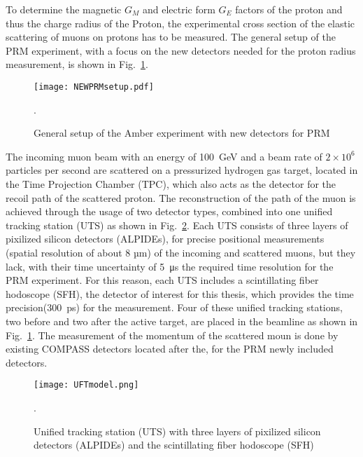 To determine the magnetic $G_M$ and electric form $G_E$ factors of the proton and thus the charge radius of the Proton,
the experimental cross section of the elastic scattering of muons on protons has to be measured.
The general setup of the PRM experiment, with a focus on the new detectors needed for the proton radius measurement, is shown in Fig.~\ref{fig:amber_setup}.
\begin{figure}[H]
	\centering
	\texttt{[image: NEWPRMsetup.pdf]}
	\caption{General setup of the Amber experiment with new detectors for PRM\autocite{InternalcommunicationKarl}}.
	\label{fig:amber_setup}
\end{figure}
The incoming muon beam with an energy of \SI{100} {\giga\electronvolt}\autocite{ProposalAmber} and a beam rate of $2 \times 10^6$\autocite{ConfrancePaperDAQ} particles per second are scattered on a pressurized hydrogen gas target,
located in the Time Projection Chamber (TPC), 
which also acts as the detector for the recoil path of the scattered proton.
\newline
The reconstruction of the path of the muon is achieved through the usage of two detector types,
combined into one unified tracking station (UTS) as shown in Fig.~\ref{UTSpicture}.
\newline
Each UTS consists of three layers of pixilized silicon detectors (ALPIDEs), for precise positional measurements (spatial resolution of about 8 µm\autocite{Amber2022Status}) of the incoming and scattered muons, 
but they lack, with their time uncertainty of \SI{5} {\micro\second}\autocite{Amber2022Status} the required time resolution for the PRM experiment.
For this reason, each UTS includes a scintillating fiber hodoscope (SFH), the detector of interest for this thesis,
which provides the time precision(\SI{300} {\pico\second}\Autocite{Amber2022Status}) for the measurement.
\newline
Four of these unified tracking stations, two before and two after the active target, are placed in the beamline as shown in Fig.~\ref{fig:amber_setup}.
The measurement of the momentum of the scattered moun is done by existing COMPASS detectors located after the, 
for the PRM newly included detectors\autocite{ProposalAmber}.

\begin{figure}[H]	
	\centering
	\texttt{[image: UFTmodel.png]}
	\caption{Unified tracking station (UTS) with three layers of pixilized silicon detectors (ALPIDEs) and the scintillating fiber hodoscope (SFH)\autocite{InternalcommunicationKarl}}.
	\label{UTSpicture}
\end{figure}
